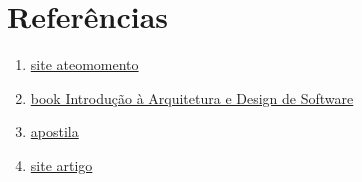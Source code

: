 \section{Referências}


  \begin{enumerate}
    
    \item  \href{https://ateomomento.com.br}{site ateomomento}
    \item  \href{https://casadocodigo.com.br}{book Introdução  à Arquitetura e Design de Software}
    \item  \href{http://conteudo.icmc.usp.br/pessoas/rtvb/apostila.pdf}{apostila}
    \item \href{https://www.devmedia.com.br/artigo-engenharia-de-software-10-documento-de-requisitos/11909}{site artigo}

  \end{enumerate}